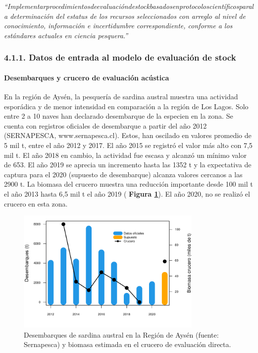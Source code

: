 \documentclass[
  spanish,
]{article}
\begin{document}
\vspace{-0.2cm}

\emph{``Implementarprocedimientosdeevaluacióndestockbasadosenprotocoloscientíficosparala
determinación del estatus de los recursos seleccionados con arreglo al
nivel de conocimiento, información e incertidumbre correspondiente,
conforme a los estándares actuales en ciencia pesquera.''}
\vspace{0.5cm}

\hypertarget{datos-de-entrada-al-modelo-de-evaluaciuxf3n-de-stock-1}{%
\subsubsection{4.1.1. Datos de entrada al modelo de evaluación de
stock}\label{datos-de-entrada-al-modelo-de-evaluaciuxf3n-de-stock-1}}

\hypertarget{desembarques-y-crucero-de-evaluaciuxf3n-acuxfastica}{%
\paragraph{Desembarques y crucero de evaluación
acústica}\label{desembarques-y-crucero-de-evaluaciuxf3n-acuxfastica}}

\quad

En la región de Aysén, la pesquería de sardina austral muestra una
actividad esporádica y de menor intensidad en comparación a la región de
Los Lagos. Solo entre 2 a 10 naves han declarado desembarque de la
especien en la zona. Se cuenta con registros oficiales de desembarque a
partir del año 2012 (SERNAPESCA, www.sernapesca.cl). Estos, han oscilado
en valores promedio de 5 mil t, entre el año 2012 y 2017. El año 2015 se
registró el valor más alto con 7,5 mil t. El año 2018 en cambio, la
actividad fue escasa y alcanzó un mínimo valor de 653. El año 2019 se
aprecia un incremento hasta las 1352 t y la expectativa de captura para
el 2020 (supuesto de desembarque) alcanza valores cercanos a las 2900 t.
La biomasa del crucero muestra una reducción importante desde 100 mil t
el año 2013 hasta 6,5 mil t el año 2019 ( \textbf{Figura \ref{Fig9}}).
El año 2020, no se realizó el crucero en esta zona. \vspace{0.5cm}

\begin{figure}[h!]
\centering
\includegraphics[width=0.8\textwidth]{Figuras/Fig9_InformeFinal-1.pdf}
\caption{Desembarques de sardina austral en la Región de Aysén (fuente: Sernapesca) y biomasa estimada en el crucero de evaluación directa.}
\label{Fig9}
\end{figure}
\end{document}
